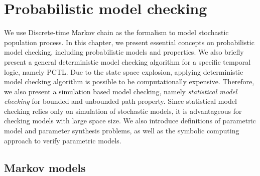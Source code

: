 \chapter{Probabilistic model checking}
We use Discrete-time Markov chain as the formalism to model stochastic population process. In this
chapter, we present essential concepts on probabilistic model checking, including probabilistic
models and properties. We also briefly present a general deterministic model checking algorithm for
a specific temporal logic, namely PCTL. Due to the state space explosion, applying deterministic
model checking algorithm is possible to be computationally expensive. Therefore, we also present a
simulation based model checking, namely \textit{statistical model checking} for bounded and
unbounded path property. Since statistical model checking relies only on simulation of stochastic
models, it is advantageous for checking models with large space size. We also introduce definitions
of parametric model and parameter synthesis problems, as well as the symbolic computing approach to
verify parametric models.


\section{Markov models}
